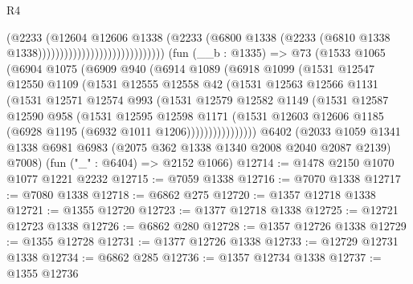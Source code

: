 \begin{lexlean}{R4}
\begin{coremodule}
                                                  (@2233
                                                    (@12604
                                                      @12606
                                                      @1338
                                                      (@2233
                                                        (@6800
                                                          @1338
                                                          (@2233
                                                            (@6810
                                                              @1338
                                                              @1338)))))))))))))))))))))))))))))
    (fun (__b : @1335) =>
    @73
      (@1533
        @1065
        (@6904
          @1075
          (@6909
            @940
            (@6914
              @1089
              (@6918
                @1099
                (@1531
                  @12547
                  @12550
                  @1109
                  (@1531
                    @12555
                    @12558
                    @42
                    (@1531
                      @12563
                      @12566
                      @1131
                      (@1531
                        @12571
                        @12574
                        @993
                        (@1531
                          @12579
                          @12582
                          @1149
                          (@1531
                            @12587
                            @12590
                            @958
                            (@1531
                              @12595
                              @12598
                              @1171
                              (@1531
                                @12603
                                @12606
                                @1185
                                (@6928 @1195 (@6932 @1011 @1206))))))))))))))))
    @6402
    (@2033 @1059 @1341 @1338 @6981 @6983 (@2075 @362 @1338 @1340 @2008 @2040 @2087 @2139) @7008)
    (fun ("_" : @6404) => @2152 @1066)
@12714 := @1478 @2150 @1070 @1077 @1221 @2232
@12715 := @7059 @1338
@12716 := @7070 @1338
@12717 := @7080 @1338
@12718 := @6862 @275
@12720 := @1357 @12718 @1338
@12721 := @1355 @12720
@12723 := @1377 @12718 @1338
@12725 := @12721 @12723 @1338
@12726 := @6862 @280
@12728 := @1357 @12726 @1338
@12729 := @1355 @12728
@12731 := @1377 @12726 @1338
@12733 := @12729 @12731 @1338
@12734 := @6862 @285
@12736 := @1357 @12734 @1338
@12737 := @1355 @12736

\end{coremodule}
\end{lexlean}
